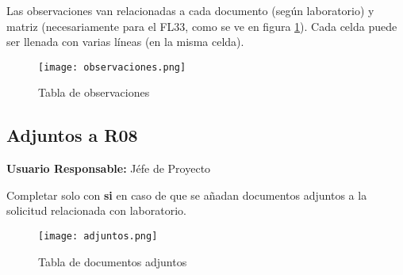 Las observaciones van relacionadas a cada documento (según laboratorio) y matriz (necesariamente para el FL33, como se ve en figura \ref{observaciones}). Cada celda puede ser llenada con varias líneas (en la misma celda).

\begin{landscape}
\begin{figure}
	\centering
	\texttt{[image: observaciones.png]}
	\caption{Tabla de observaciones}
	\label{observaciones}
\end{figure}
\end{landscape}

\subsection{Adjuntos a R08} 

\textbf{Usuario Responsable:} Jéfe de Proyecto

Completar solo con \textbf{si} en caso de que se añadan documentos adjuntos a la solicitud relacionada con laboratorio.

\begin{figure}
	\centering
	\texttt{[image: adjuntos.png]}
	\caption{Tabla de documentos adjuntos}
	\label{adjuntos}
\end{figure}